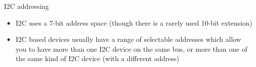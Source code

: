 \begin{frame}
   {I2C addressing}
   \begin{itemize}
      \item I2C uses a 7-bit address space
	   (though there is a rarely used 10-bit extension)
      \item I2C based devices usually have a range of selectable addresses which allow
	    you to have more than one I2C device on the same bus, or more than one
            of the same kind of I2C device (with a different address)
   \end{itemize}
\end{frame}

\cprotect\note{

}

